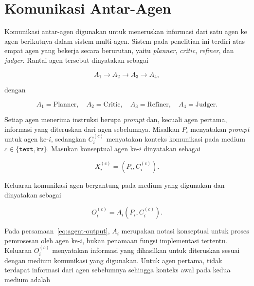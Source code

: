 \section{Komunikasi Antar-Agen}

\label{sec:komunikasi-antar-agen}

Komunikasi antar-agen digunakan untuk meneruskan informasi dari satu
agen ke agen berikutnya dalam sistem multi-agen. Sistem pada penelitian
ini terdiri atas empat agen yang bekerja secara berurutan, yaitu
\textit{planner}, \textit{critic}, \textit{refiner}, dan
\textit{judger}. Rantai agen tersebut dinyatakan sebagai

\begin{equation}
    A_1
    \longrightarrow
    A_2
    \longrightarrow
    A_3
    \longrightarrow
    A_4,
    \label{eq:agent-chain}
\end{equation}

dengan

\begin{equation}
    A_1=\text{Planner},\quad
    A_2=\text{Critic},\quad
    A_3=\text{Refiner},\quad
    A_4=\text{Judger}.
    \label{eq:agent-roles}
\end{equation}

Setiap agen menerima instruksi berupa \textit{prompt} dan, kecuali
agen pertama, informasi yang diteruskan dari agen sebelumnya. Misalkan
$P_i$ menyatakan \textit{prompt} untuk agen ke-$i$, sedangkan
$C_i^{(c)}$ menyatakan konteks komunikasi pada medium
$c\in\{\texttt{text},\texttt{kv}\}$. Masukan konseptual agen ke-$i$
dinyatakan sebagai

\begin{equation}
    X_i^{(c)}
    =
    \left(P_i,C_i^{(c)}\right).
    \label{eq:agent-input}
\end{equation}

Keluaran komunikasi agen bergantung pada medium yang digunakan dan
dinyatakan sebagai

\begin{equation}
    O_i^{(c)}
    =
    A_i\left(P_i,C_i^{(c)}\right).
    \label{eq:agent-output}
\end{equation}

Pada persamaan~\eqref{eq:agent-output}, $A_i$ merupakan notasi
konseptual untuk proses pemrosesan oleh agen ke-$i$, bukan penamaan
fungsi implementasi tertentu. Keluaran $O_i^{(c)}$ menyatakan
informasi yang dihasilkan untuk diteruskan sesuai dengan medium
komunikasi yang digunakan. Untuk agen pertama, tidak terdapat
informasi dari agen sebelumnya sehingga konteks awal pada kedua
medium adalah

